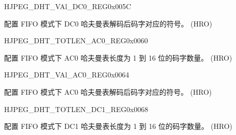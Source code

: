 \begin{register}{H}{JPEG\_DHT\_VAl\_DC0\_REG}{0x005C}\label{regdesc:JPEGDHTVALDC0REG}
%
\regnewline%
\begin{regdesc}\begin{reglist}
\label{fielddesc:JPEGDHTVALDC0}\item [JPEG\_DHT\_VAL\_DC0] 配置 FIFO 模式下 DC0 哈夫曼表解码后码字对应的符号。 (HRO)
\end{reglist}\end{regdesc}
\end{register}


\begin{register}{H}{JPEG\_DHT\_TOTLEN\_AC0\_REG}{0x0060}\label{regdesc:JPEGDHTTOTLENAC0REG}
%
\regnewline%
\begin{regdesc}\begin{reglist}
\label{fielddesc:JPEGDHTTOTLENAC0}\item [JPEG\_DHT\_TOTLEN\_AC0] 配置 FIFO 模式下 AC0 哈夫曼表长度为 1 到 16 位的码字数量。 (HRO)
\end{reglist}\end{regdesc}
\end{register}


\begin{register}{H}{JPEG\_DHT\_VAl\_AC0\_REG}{0x0064}\label{regdesc:JPEGDHTVALAC0REG}
%
\regnewline%
\begin{regdesc}\begin{reglist}
\label{fielddesc:JPEGDHTVALAC0}\item [JPEG\_DHT\_VAL\_AC0] 配置 FIFO 模式下 AC0 哈夫曼表解码后码字对应的符号。 (HRO)
\end{reglist}\end{regdesc}
\end{register}


\begin{register}{H}{JPEG\_DHT\_TOTLEN\_DC1\_REG}{0x0068}\label{regdesc:JPEGDHTTOTLENDC1REG}
%
\regnewline%
\begin{regdesc}\begin{reglist}
\label{fielddesc:JPEGDHTTOTLENDC1}\item [JPEG\_DHT\_TOTLEN\_DC1] 配置 FIFO 模式下 DC1 哈夫曼表长度为 1 到 16 位的码字数量。 (HRO)
\end{reglist}\end{regdesc}
\end{register}



